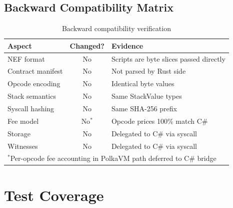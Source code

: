 \documentclass[11pt,a4paper]{article}
\begin{document}
\subsection{Backward Compatibility Matrix}

\begin{table}[h]
\centering
\begin{tabular}{@{}lcp{6cm}@{}}
\toprule
\textbf{Aspect} & \textbf{Changed?} & \textbf{Evidence} \\
\midrule
NEF format & No & Scripts are byte slices passed directly \\
Contract manifest & No & Not parsed by Rust side \\
Opcode encoding & No & Identical byte values \\
Stack semantics & No & Same StackValue types \\
Syscall hashing & No & Same SHA-256 prefix \\
Fee model & No$^*$ & Opcode prices 100\% match C\# \\
Storage & No & Delegated to C\# via syscall \\
Witnesses & No & Delegated to C\# via syscall \\
\bottomrule
\multicolumn{3}{l}{\footnotesize $^*$Per-opcode fee accounting in PolkaVM path deferred to C\# bridge}
\end{tabular}
\caption{Backward compatibility verification}
\label{tab:compat}
\end{table}

\section{Test Coverage}
\end{document}
